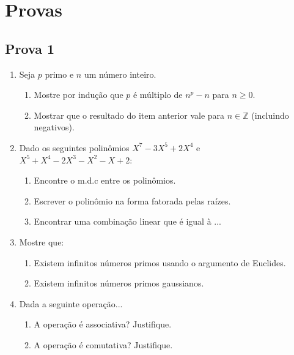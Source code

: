\section{Provas}

\subsection{Prova 1}

\begin{enumerate}[left=0.5cm, align=left, nosep]
    \item Seja $p$ primo e $n$ um número inteiro.
    \begin{enumerate}[label=\alph*), left=0.5cm, align=left, nosep]
        \item Mostre por indução que $p$ é múltiplo de $n^p - n$ para $n \geq 0$.  
        \item Mostrar que o resultado do item anterior vale para $n \in \mathbb{Z}$ (incluindo negativos).
    \end{enumerate}

    \item Dado os seguintes polinômios $X^7 - 3X^5 + 2X^4$ e $X^5 + X^4 - 2X^3 - X^2 - X + 2$:
    \begin{enumerate}[label=\alph*), left=0.5cm, align=left, nosep]
        \item Encontre o m.d.c entre os polinômios.
        \item Escrever o polinômio na forma fatorada pelas raízes.
        \item Encontrar uma combinação linear que é igual à ...
    \end{enumerate}

    \item Mostre que: 
    \begin{enumerate}[label=\alph*), left=0.5cm, align=left, nosep]
        \item Existem infinitos números primos usando o argumento de Euclides. 
        \item Existem infinitos números primos gaussianos.
    \end{enumerate}

    \item Dada a seguinte operação...
    \begin{enumerate}[label=\alph*), left=0.5cm, align=left, nosep]
        \item A operação é associativa? Justifique. 
        \item A operação é comutativa? Justifique.
    \end{enumerate}
\end{enumerate}

